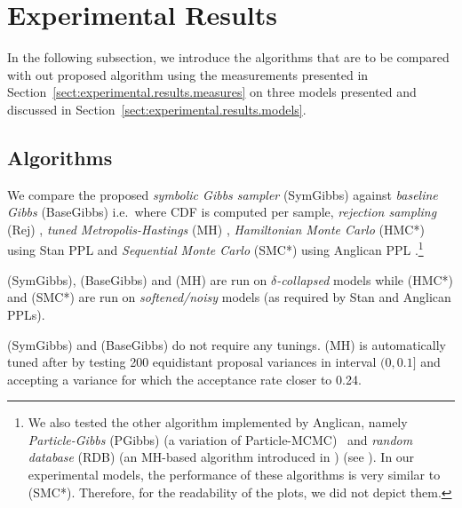\documentclass[]{article}
\begin{document}
\section{Experimental Results}
\label{sect:experimental.results}
In the following subsection, we introduce the algorithms that are to be compared 
with out proposed algorithm using the measurements presented in Section~\ref{sect:experimental.results.measures}
on three models presented and discussed in Section~\ref{sect:experimental.results.models}. 


\subsection{Algorithms} 
\label{sect:experimental.results.algorithms}
We compare the proposed \emph{symbolic Gibbs sampler} (SymGibbs) against
\emph{baseline Gibbs} (BaseGibbs) \citep{pearl1987evidential}
i.e.\ where CDF is computed per sample, 
\emph{rejection sampling} (Rej) \citep{hammersley1964monte}, 
\emph{tuned Metropolis-Hastings} (MH) \citep{roberts1997weak}, 
\emph{Hamiltonian Monte Carlo} (HMC*) using Stan PPL \citep{stan-manual:2014}
and \emph{Sequential Monte Carlo} (SMC*) using Anglican PPL \citep{wood2014new}.\footnote{
We also tested the other algorithm implemented by Anglican, namely 
\emph{Particle-Gibbs} (PGibbs) (a variation of Particle-MCMC\citep{andrieu2010particle}) \
and \emph{random database} (RDB) (an MH-based algorithm introduced in \citep{wingate2011lightweight}) (see \cite{wood2014new}).
In our experimental models, the performance of these algorithms is very similar to (SMC*).
Therefore, for the readability of the plots, we did not depict them.
}

(SymGibbs), (BaseGibbs) and (MH) are run on \emph{$\delta$-collapsed} models while (HMC*) and (SMC*) are run on \emph{softened/noisy} models (as required by Stan and Anglican PPLs).

(SymGibbs) and (BaseGibbs) do not require any tunings. 
(MH) is automatically tuned after \citep{roberts1997weak} by testing 200 equidistant proposal variances in interval 
$(0, 0.1]$ and accepting a variance for which the acceptance rate closer to 0.24.
\end{document}
